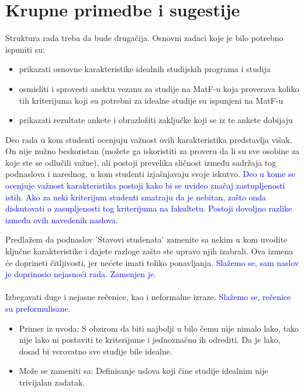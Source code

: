 \documentclass[a4paper]{report}
\newcommand{\odgovor}[1]{\textcolor{blue}{#1}}
\begin{document}
 
 
 \section{Krupne primedbe i sugestije}
 Struktura rada treba da bude drugačija. Osnovni zadaci koje je bilo potrebno ispuniti su:
     \begin{itemize}
         \item prikazati osnovne karakteristike idealnih studijskih programa i studija
         \item osmisliti i sprovesti anektu vezanu za studije na MatF-u koja proverava koliko tih kriterijuma koji su potrebni za idealne studije su ispunjeni na MatF-u
         \item prikazati rezultate ankete i obrazložiti zaključke koji se iz te ankete dobijaju 
     \end{itemize}
 Deo rada u kom studenti ocenjuju važnost ovih karakteristika predstavlja višak. On nije nužno beskoristan (možete ga iskoristiti za proveru da li su sve osobine za koje ste se odlučili važne), ali postoji prevelika sličnost između sadržaja tog podnaslova i narednog, u kom studenti izjašnjavaju svoje iskutvo. 
 \odgovor{Deo u kome se ocenjuje važnost karakteristika postoji kako bi se uvideo značaj zastupljenosti istih. Ako za neki kriterijum studenti smatraju da je nebitan, zašto onda diskutovati o zasupljenosti tog kriterijuma na fakultetu. Postoji dovoljno razlike između ovih navedenih naslova.}
 
 Predlažem da podnaslov 'Stavovi studenata' zamenite sa nekim u kom uvodite ključne karakteristike i dajete razloge zašto ste upravo njih izabrali. Ova izmena će doprineti čitljivosti, jer nećete imati toliko ponavljanja.
 \odgovor{Slažemo se, sam naslov je doprinosio nejasnoći rada. Zamenjen je.}
 \\
 \\
 Izbegavati duge i nejasne rečenice, kao i neformalne izraze. 
 \odgovor{Slažemo se, rečenice su preformulisane.}
 
 
 
 \begin{itemize}
     \item Primer iz uvoda: S obzirom da biti najbolji u bilo čemu nije nimalo lako, tako nije lako ni postaviti te kriterijume i jednoznačno ih odrediti. Da je lako, dosad bi verovatno sve studije bile idealne. 
     \item Može se zameniti sa: Definisanje uslova koji čine studije idealnim nije trivijalan zadatak.
 \end{itemize}
 
\end{document}
